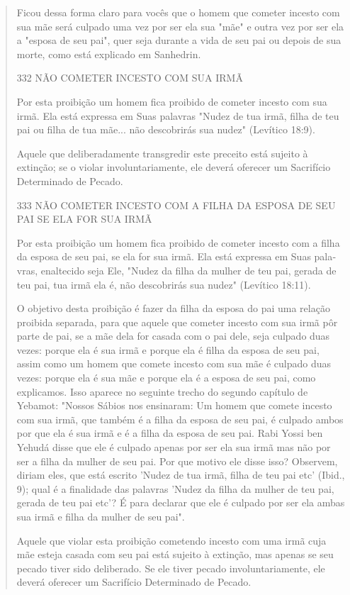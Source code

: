 \begin{quote}
Ficou dessa forma claro para vocês que o homem que cometer in­cesto com
sua mãe será culpado uma vez por ser ela sua "mãe" e outra vez por ser
ela a "esposa de seu pai", quer seja durante a vida de seu pai ou depois
de sua morte, como está explicado em Sanhedrin.

332 NÃO COMETER INCESTO COM SUA IRMÃ

Por esta proibição um homem fica proibido de cometer incesto com sua
irmã. Ela está expressa em Suas palavras "Nudez de tua irmã, filha de
teu pai ou filha de tua mãe... não descobrirás sua nudez" (Levítico
18:9).

Aquele que deliberadamente transgredir este preceito está sujeito à
extinção; se o violar involuntariamente, ele deverá oferecer um
Sacrifício De­terminado de Pecado.

333 NÃO COMETER INCESTO COM A FILHA DA ESPOSA DE SEU PAI SE ELA FOR SUA
IRMÃ

Por esta proibição um homem fica proibido de cometer incesto com a filha
da esposa de seu pai, se ela for sua irmã. Ela está expressa em Suas
pala­vras, enaltecido seja Ele, "Nudez da filha da mulher de teu pai,
gerada de teu pai, tua irmã ela é, não descobrirás sua nudez" (Levítico
18:11).

O objetivo desta proibição é fazer da filha da esposa do pai uma
re­lação proibida separada, para que aquele que cometer incesto com sua
irmã pôr parte de pai, se a mãe dela for casada com o pai dele, seja
culpado duas vezes: porque ela é sua irmã e porque ela é filha da esposa
de seu pai, assim como um homem que comete incesto com sua mãe é culpado
duas vezes: porque ela é sua mãe e porque ela é a esposa de seu pai,
como explicamos. Isso aparece no seguinte trecho do segundo capítulo de
Yebamot: "Nossos Sábios nos ensi­naram: Um homem que comete incesto com
sua irmã, que também é a filha da esposa de seu pai, é culpado ambos por
que ela é sua irmã e é a filha da esposa de seu pai. Rabi Yossi ben
Yehudá disse que ele é culpado apenas por ser ela sua irmã mas não por
ser a filha da mulher de seu pai. Por que motivo ele disse isso?
Observem, diriam eles, que está escrito 'Nudez de tua irmã, filha de teu
pai etc' (Ibid., 9); qual é a finalidade das palavras 'Nudez da filha da
mu­lher de teu pai, gerada de teu pai etc'? É para declarar que ele é
culpado por ser ela ambas sua irmã e filha da mulher de seu pai".

Aquele que violar esta proibição cometendo incesto com uma irmã cuja mãe
esteja casada com seu pai está sujeito à extinção, mas apenas se seu
pecado tiver sido deliberado. Se ele tiver pecado involuntariamente, ele
deve­rá oferecer um Sacrifício Determinado de Pecado.


\end{quote}
